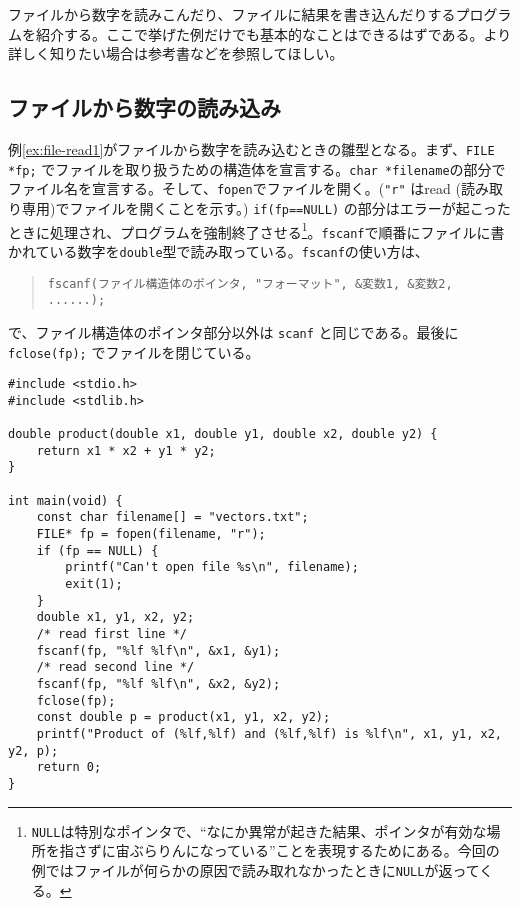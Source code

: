 ファイルから数字を読みこんだり、ファイルに結果を書き込んだりするプログラムを紹介する。ここで挙げた例だけでも基本的なことはできるはずである。より詳しく知りたい場合は参考書などを参照してほしい。

\subsection{ファイルから数字の読み込み}

例\ref{ex:file-read1}がファイルから数字を読み込むときの雛型となる。まず、\texttt{FILE *fp;} でファイルを取り扱うための構造体を宣言する。\texttt{char *filename}の部分でファイル名を宣言する。そして、\texttt{fopen}でファイルを開く。(\texttt{"r"} はread (読み取り専用)でファイルを開くことを示す。) \texttt{if(fp==NULL){}} の部分はエラーが起こったときに処理され、プログラムを強制終了させる\footnote{\texttt{NULL}は特別なポインタで、``なにか異常が起きた結果、ポインタが有効な場所を指さずに宙ぶらりんになっている''ことを表現するためにある。今回の例ではファイルが何らかの原因で読み取れなかったときに\texttt{NULL}が返ってくる。}。\texttt{fscanf}で順番にファイルに書かれている数字を\texttt{double}型で読み取っている。\texttt{fscanf}の使い方は、
\begin{quote}
    \begin{verbatim}
fscanf(ファイル構造体のポインタ, "フォーマット", &変数1, &変数2, ......);
\end{verbatim}
\end{quote}
で、ファイル構造体のポインタ部分以外は \texttt{scanf} と同じである。最後に \texttt{fclose(fp);} でファイルを閉じている。
\begin{reidai}\label{ex:file-read1}
    \begin{verbatim}
#include <stdio.h>
#include <stdlib.h>

double product(double x1, double y1, double x2, double y2) {
    return x1 * x2 + y1 * y2;
}

int main(void) {
    const char filename[] = "vectors.txt";
    FILE* fp = fopen(filename, "r");
    if (fp == NULL) {
        printf("Can't open file %s\n", filename);
        exit(1);
    }
    double x1, y1, x2, y2;
    /* read first line */
    fscanf(fp, "%lf %lf\n", &x1, &y1);
    /* read second line */
    fscanf(fp, "%lf %lf\n", &x2, &y2);
    fclose(fp);
    const double p = product(x1, y1, x2, y2);
    printf("Product of (%lf,%lf) and (%lf,%lf) is %lf\n", x1, y1, x2, y2, p);
    return 0;
}
\end{verbatim}
\end{reidai} \noindent
